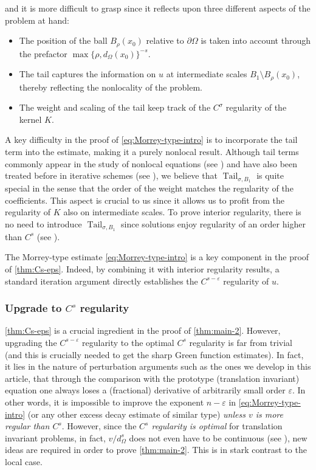 \documentclass[11pt,reqno]{amsart}
\theoremstyle{plain}
\theoremstyle{definition}
\numberwithin{equation}{section}
\newcommand{\eps}{\varepsilon}
\newcommand{\1}{\mathbbm{1}}
\DeclareMathOperator{\tail}{Tail}
\begin{document}
and it is more difficult to grasp since it reflects upon three different aspects of the problem at hand:
\begin{itemize}
    \item The position of the ball $B_{\rho}(x_0)$ relative to $\partial\Omega$ is taken into account through the prefactor $\max\{ \rho , d_{\Omega}(x_0) \}^{-s}$.
    \item The tail captures the information on $u$ at intermediate scales $B_1 \setminus B_{\rho}(x_0)$, thereby reflecting the nonlocality of the problem.
    \item The weight and scaling of the tail keep track of the $C^{\sigma}$ regularity of the kernel $K$.
\end{itemize}

A key difficulty in the proof of \eqref{eq:Morrey-type-intro} is to incorporate the tail term into the estimate, making it a purely nonlocal result. Although tail terms commonly appear in the study of nonlocal equations (see \cite{DKP14,DKP16,KaWe24}) and have also been treated before in iterative schemes (see \cite{KNS22,BDLMS25}), we believe that $\tail_{\sigma,B_1}$ is quite special in the sense that the order of the weight matches the regularity of the coefficients. This aspect is crucial to us since it allows us to profit from the regularity of $K$ also on intermediate scales. To prove interior regularity, there is no need to introduce $\tail_{\sigma,B_1}$ since solutions enjoy regularity of an order higher than $C^s$ (see \cite[Lemma 3.5]{KNS22}).

The Morrey-type estimate \eqref{eq:Morrey-type-intro} is a key component in the proof of \autoref{thm:Cs-eps}. Indeed, by combining it with interior regularity results, a standard iteration argument directly establishes the $C^{s-\eps}$ regularity of $u$.

\subsubsection{Upgrade to $C^s$ regularity}

\autoref{thm:Cs-eps} is a crucial ingredient in the proof of \autoref{thm:main-2}. However, upgrading the $C^{s-\eps}$ regularity to the optimal $C^s$ regularity is far from trivial (and this is crucially needed to get the sharp Green function estimates). In fact, it lies in the nature of perturbation arguments such as the ones we develop in this article, that through the comparison with the prototype (translation invariant) equation one always loses a (fractional) derivative of arbitrarily small order $\eps$. In other words, it is impossible to improve the exponent $n-\eps$ in \eqref{eq:Morrey-type-intro} (or any other excess decay estimate of similar type) \textit{unless $v$ is more regular than $C^s$}. However, since the \textit{$C^s$ regularity is optimal} for translation invariant problems, in fact, $v/d_{\Omega}^s$ does not even have to be continuous (see \cite{RoWe24}), new ideas are required in order to prove \autoref{thm:main-2}. This is in stark contrast to the local case.
\end{document}
